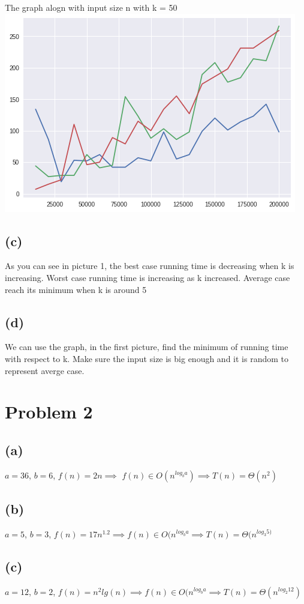 \documentclass{article}
\begin{document}
The graph alogn with input size n with k = 50 \\
\includegraphics{k50.png}

\subsection*{(c)}
As you can see in picture 1, the best case running time is decreasing when k is increasing.
Worst case running time is increasing as k increased.
Average case reach its minimum when k is around 5
\subsection*{(d)}
We can use the graph, in the first picture, find the minimum of running time with respect to k.
Make sure the input size is big enough and it is random to represent averge case.

\section*{Problem 2}
\subsection*{(a)}
$ a = 36$, $b = 6$, $f(n) = 2n \implies$ $f(n) \in O(n^{log_b a}) \implies T(n) = \Theta(n^2) $
\subsection*{(b)}
$ a = 5$, $b = 3$, $f(n) = 17n^{1.2} \implies f(n) \in O(n^{log_b a} \implies T(n) = \Theta(n^{log_3 5)}$
\subsection*{(c)}
$ a = 12$, $b = 2$, $f(n) = n^2 lg(n) \implies f(n) \in O(n^{log_b a} \implies T(n) = \Theta(n^{log_2 12})$
\end{document}
